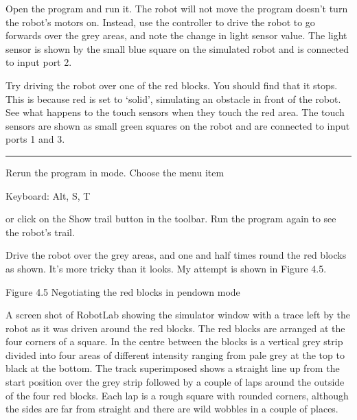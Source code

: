 \documentclass[letterpaper,10pt,english]{sphinxmanual}
\begin{document}
Open the  program and run it. The robot will not move \textendash{} the program doesn’t turn the robot’s motors on. Instead, use the controller to drive the robot to go forwards over the grey areas, and note the change in light sensor value. The light sensor is shown by the small blue square on the simulated robot and is connected to input port 2.

Try driving the robot over one of the red blocks. You should find that it stops. This is because red is set to ‘solid’, simulating an obstacle in front of the robot. See what happens to the touch sensors when they touch the red area. The touch sensors are shown as small green squares on the robot and are connected to input ports 1 and 3.


\bigskip\hrule\bigskip


Rerun the  program in  mode. Choose the  menu item





Keyboard: Alt, S, T





or click on the Show trail  button in the toolbar. Run the program again to see the robot’s trail.

Drive the robot over the grey areas, and one and half times round the red blocks as shown. It’s more tricky than it looks. My attempt is shown in Figure 4.5.


Figure 4.5 Negotiating the red blocks in pen\sphinxhyphen{}down mode

A screen shot of RobotLab showing the simulator window with a trace left by the robot as it was driven around the red blocks. The red blocks are arranged at the four corners of a square. In the centre between the blocks is a vertical grey strip divided into four areas of different intensity ranging from pale grey at the top to black at the bottom. The track superimposed shows a straight line up from the start position over the grey strip followed by a couple of laps around the outside of the
four red blocks. Each lap is a rough square with rounded corners, although the sides are far from straight and there are wild wobbles in a couple of places.
\end{document}
